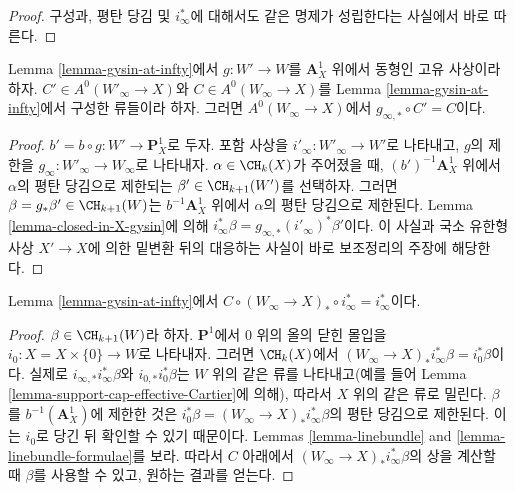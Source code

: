 \begin{proof}
구성과, 평탄 당김 및 $i_\infty^*$에 대해서도 같은 명제가 성립한다는
사실에서 바로 따른다.
\end{proof}

\begin{lemma}
\label{lemma-gysin-at-infty-independent}
Lemma \ref{lemma-gysin-at-infty}에서 $g : W' \to W$를
$\mathbf{A}^1_X$ 위에서 동형인 고유 사상이라 하자.
$C' \in A^0(W'_\infty \to X)$와 $C \in A^0(W_\infty \to X)$를
Lemma \ref{lemma-gysin-at-infty}에서 구성한 류들이라 하자. 그러면
$A^0(W_\infty \to X)$에서 $g_{\infty, *} \circ C' = C$이다.
\end{lemma}

\begin{proof}
$b' = b \circ g : W' \to \mathbf{P}^1_X$로 두자. 포함 사상을
$i'_\infty : W'_\infty \to W'$로 나타내고, $g$의 제한을
$g_\infty : W'_\infty \to W_\infty$로 나타내자.
$\alpha \in \CH_k(X)$가 주어졌을 때, $(b')^{-1}\mathbf{A}^1_X$ 위에서
$\alpha$의 평탄 당김으로 제한되는 $\beta' \in \CH_{k + 1}(W')$를
선택하자. 그러면 $\beta = g_*\beta' \in \CH_{k + 1}(W)$는
$b^{-1}\mathbf{A}^1_X$ 위에서 $\alpha$의 평탄 당김으로 제한된다. Lemma
\ref{lemma-closed-in-X-gysin}에 의해
$i_\infty^*\beta = g_{\infty, *}(i'_\infty)^*\beta'$이다. 이 사실과 국소
유한형 사상 $X' \to X$에 의한 밑변환 뒤의 대응하는 사실이 바로
보조정리의 주장에 해당한다.
\end{proof}

\begin{lemma}
\label{lemma-homomorphism-pre}
Lemma \ref{lemma-gysin-at-infty}에서
$C \circ (W_\infty \to X)_* \circ i_\infty^* = i_\infty^*$이다.
\end{lemma}

\begin{proof}
$\beta \in \CH_{k + 1}(W)$라 하자. $\mathbf{P}^1$에서 $0$ 위의 올의 닫힌
몰입을 $i_0 : X = X \times \{0\} \to W$로 나타내자. 그러면
$\CH_k(X)$에서
$(W_\infty \to X)_* i_\infty^* \beta = i_0^*\beta$이다. 실제로
$i_{\infty, *}i_\infty^*\beta$와 $i_{0, *}i_0^*\beta$는 $W$ 위의 같은 류를
나타내고(예를 들어 Lemma \ref{lemma-support-cap-effective-Cartier}에
의해), 따라서 $X$ 위의 같은 류로 밀린다. $\beta$를
$b^{-1}(\mathbf{A}^1_X)$에 제한한 것은
$i_0^*\beta = (W_\infty \to X)_* i_\infty^* \beta$의 평탄 당김으로
제한된다. 이는 $i_0$로 당긴 뒤 확인할 수 있기 때문이다. Lemmas
\ref{lemma-linebundle} and \ref{lemma-linebundle-formulae}를 보라. 따라서
$C$ 아래에서 $(W_\infty \to X)_*i_\infty^*\beta$의 상을 계산할 때
$\beta$를 사용할 수 있고, 원하는 결과를 얻는다.
\end{proof}

